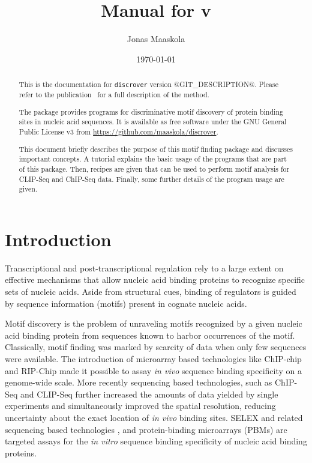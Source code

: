 \documentclass[a4paper]{article}
\title{Manual for \discrover{} v\version{}}
\author{Jonas Maaskola}
\date{\today}
\makeatletter
\newcommand{\discrover}[0]{\texttt{discrover}}
\newcommand{\version}[0]{@GIT_DESCRIPTION@}
\newcommand{\theurl}[0]{\url{https://github.com/maaskola/discrover}}
\makeatother
\begin{document}
\maketitle

\begin{abstract}
  This is the documentation for \discrover{} version \version{}.
  Please refer to the publication~\cite{Maaskola2014} for a full description of the method.

  The package provides programs for discriminative motif discovery of protein binding sites in nucleic acid sequences.
  It is available as free software under the GNU General Public License v3 from \theurl{}.

  This document briefly describes the purpose of this motif finding package and discusses important concepts.
  A tutorial explains the basic usage of the programs that are part of this package.
  Then, recipes are given that can be used to perform motif analysis for CLIP-Seq and ChIP-Seq data.
  Finally, some further details of the program usage are given.
\end{abstract}

\tableofcontents

\section{Introduction}

Transcriptional and post-transcriptional regulation rely to a large extent on effective mechanisms that allow nucleic acid binding proteins to recognize specific sets of nucleic acids.
Aside from structural cues, binding of regulators is guided by sequence information (motifs) present in cognate nucleic acids.

Motif discovery is the problem of unraveling motifs recognized by a given nucleic acid binding protein from sequences known to harbor occurrences of the motif.
Classically, motif finding was marked by scarcity of data when only few sequences were available.
The introduction of microarray based technologies like ChIP-chip \cite{Ren2000,Iyer2001} and RIP-Chip \cite{Tenenbaum2000,Keene2006} made it possible to assay \textit{in vivo} sequence binding specificity on a genome-wide scale.
More recently sequencing based technologies, such as ChIP-Seq \cite{Robertson2007, Johnson2007} and CLIP-Seq \cite{Licatalosi2008,Sanford2009,Hafner2010} further increased the amounts of data yielded by single experiments and simultaneously improved the spatial resolution, reducing uncertainty about the exact location of \textit{in vivo} binding sites.
SELEX \cite{Ellington1990,Tuerk1990} and related sequencing based technologies \cite{Jolma2010}, and protein-binding microarrays (PBMs) \cite{Bulyk2001,Berger2006a} are targeted assays for the \textit{in vitro} sequence binding specificity of nucleic acid binding proteins.
\end{document}

